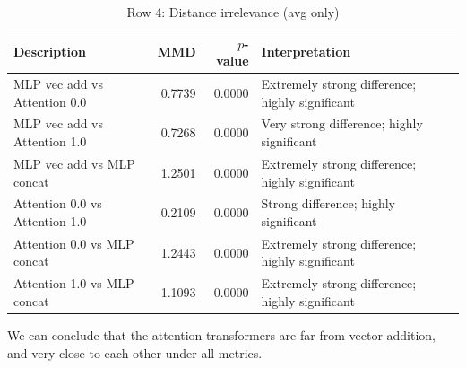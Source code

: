 \documentclass{article} %
\theoremstyle{plain}
\theoremstyle{definition}
\newtheorem{empirical fact}[theorem]{Empirical Fact}
\begin{document}
\begin{table}[t][h]
\begin{subtable}[t]{\textwidth}
\centering
\caption{Row 4: Distance irrelevance (avg only)}
\begin{tabular}{lrrl}
\toprule
Description & MMD & $p$-value & Interpretation \\
\midrule
MLP vec add vs Attention 0.0   & 0.7739 & 0.0000 & Extremely strong difference; highly significant \\
MLP vec add vs Attention 1.0   & 0.7268 & 0.0000 & Very strong difference; highly significant \\
MLP vec add vs MLP concat      & 1.2501 & 0.0000 & Extremely strong difference; highly significant \\
Attention 0.0 vs Attention 1.0 & 0.2109 & 0.0000 & Strong difference; highly significant \\
Attention 0.0 vs MLP concat    & 1.2443 & 0.0000 & Extremely strong difference; highly significant \\
Attention 1.0 vs MLP concat    & 1.1093 & 0.0000 & Extremely strong difference; highly significant \\
\bottomrule
\end{tabular}
\end{subtable}

\end{table}

We can conclude that the attention transformers are far from vector addition, and very close to each other under all metrics. 








\FloatBarrier



























\newpage
\end{document}
